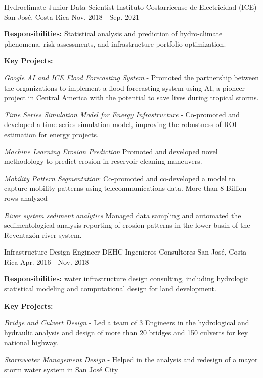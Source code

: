 \begin{cventries}
  \cventry
    {Hydroclimate Junior Data Scientist} %
    {Instituto Costarricense de Electricidad (ICE)} %
    {San José, Costa Rica} %
    {Nov. 2018 - Sep. 2021} %
    {
      \begin{cvitems} %
        \item {\textbf{Responsibilities:} Statistical analysis and prediction of hydro-climate phenomena, risk assessments, and infrastructure portfolio optimization.}
        \item {\textbf{Key Projects:}}
        \item {\textit{Google AI and ICE Flood Forecasting System} - Promoted the partnership between the organizations to implement a flood forecasting system using AI, a pioneer project in Central America with the potential to save lives during tropical storms.}
        \item {\textit{Time Series Simulation Model for Energy Infrastructure} - Co-promoted and developed a time series simulation model, improving the robustness of ROI estimation for energy projects.}
        \item {\textit{Machine Learning Erosion Prediction} Promoted and developed novel methodology to predict erosion in reservoir cleaning maneuvers.}
        \item {\textit{Mobility Pattern Segmentation}: Co-promoted and co-developed a model to capture mobility patterns using telecommunications data. More than 8 Billion rows analyzed}
        \item {\textit{River system sediment analytics} Managed data sampling and automated the sedimentological analysis reporting of erosion patterns in the lower basin of the Reventazón river system.}
      \end{cvitems}
    }

  \cventry
    {Infrastructure Design Engineer} %
    {DEHC Ingenieros Consultores} %
    {San José, Costa Rica} %
    {Apr. 2016 - Nov. 2018} %
    {
      \begin{cvitems} %
        \item {\textbf{Responsibilities:} water infrastructure design consulting,  including hydrologic statistical modeling and computational design for land development.}
        \item {\textbf{Key Projects:}}
        \item {\textit{Bridge and Culvert Design} - Led a team of 3 Engineers in the hydrological and hydraulic analysis and design of more than 20 bridges and 150 culverts for key national highway.}
        \item{\textit{Stormwater Management Design} - Helped in the analysis and redesign of a mayor storm water system in San José City}
      \end{cvitems}
    }

\end{cventries}